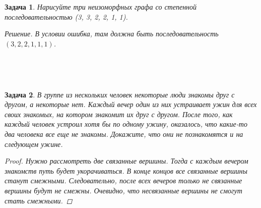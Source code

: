 \documentclass[12pt,a4paper,fleqn]{article}
\newtheorem{exersize}{Задача}
\begin{document}
\begin{exersize}
	Нарисуйте три неизоморфных графа со степенной последовательностью (3, 3, 2, 2, 1, 1).
	
	\emph{Решение.} В условии ошибка, там должна быть последовательность $(3, 2, 2, 1, 1, 1)$.
	
\begin{center}
\;\ \;\ \;\ \;\ \;\ \;\ \;\ \;\ \;\ \;\ 
\;\ \;\ \;\ \;\ \;\ \;\ \;\ \;\ \;\ \;\ 
\end{center}
\end{exersize}

\begin{exersize}
	В группе из нескольких человек некоторые люди знакомы друг с другом, а некоторые нет. Каждый вечер один из них устраивает ужин для всех своих знакомых, на котором знакомит их друг с другом. После того, как каждый человек устроил хотя бы по одному ужину, оказалось, что какие-то два человека все еще не знакомы. Докажите, что они не познакомятся и на следующем ужине.
	
\begin{proof}
	Нужно рассмотреть две связанные вершины. Тогда с каждым вечером знакомств путь будет укорачиваться. В конце концов все связанные вершины станут смежными. Следовательно, после всех вечеров только не связанные вершины будут не смежны. Очевидно, что несвязанные вершины не смогут стать смежными.
\end{proof}
\end{exersize}
\end{document}
